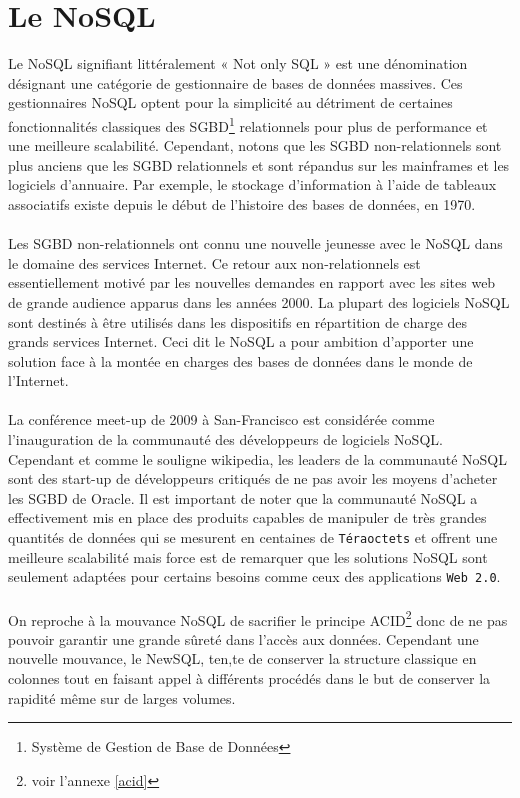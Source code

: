 \section{Le NoSQL}

Le NoSQL signifiant littéralement « \textsf{Not only SQL} » est une
dénomination désignant une catégorie de gestionnaire de bases de
données massives. Ces gestionnaires \textsf{NoSQL} optent pour la
simplicité au détriment de certaines fonctionnalités classiques des
\textsf{SGBD}\footnote{Système de Gestion de Base de Données}
relationnels pour plus de performance et une meilleure
scalabilité. Cependant, notons que les \textsf{SGBD} non-relationnels
sont plus anciens que les \textsf{SGBD} relationnels et sont répandus
sur les mainframes et les logiciels d'annuaire. Par exemple, le
stockage d'information à l'aide de tableaux associatifs existe depuis
le début de l'histoire des bases de données, en 1970.  \\ \\ Les
\textsf{SGBD} non-relationnels ont connu une nouvelle jeunesse avec le
\textsf{NoSQL} dans le domaine des services \textsf{Internet}. Ce
retour aux non-relationnels est essentiellement motivé par les
nouvelles demandes en rapport avec les sites web de grande audience
apparus dans les années 2000. La plupart des logiciels \textsf{NoSQL}
sont destinés à être utilisés dans les dispositifs en répartition de
charge des grands services \textsf{Internet}. Ceci dit le
\textsf{NoSQL} a pour ambition d'apporter une solution face à la
montée en charges des bases de données dans le monde de
l'\textsf{Internet}.  \\ \\ La conférence meet-up de 2009 à
\textsf{San-Francisco} est considérée comme l'inauguration de la
communauté des développeurs de logiciels \textsf{NoSQL}. Cependant et
comme le souligne \textsf{wikipedia}, les leaders de la communauté
NoSQL sont des \textsf{start-up} de développeurs critiqués de ne pas
avoir les moyens d'acheter les SGBD de Oracle\cite{wikiNoSQL}. Il est
important de noter que la communauté \textsf{NoSQL} a effectivement
mis en place des produits capables de manipuler de très grandes
quantités de données qui se mesurent en centaines de
\texttt{Téraoctets} et offrent une meilleure scalabilité mais force
est de remarquer que les solutions \textsf{NoSQL} sont seulement
adaptées pour certains besoins comme ceux des applications \texttt{Web
  2.0}.  \\\\ On reproche à la mouvance \textsf{NoSQL} de sacrifier le
principe \textsf{ACID}\footnote{voir l'annexe \ref{acid}} donc de ne
pas pouvoir garantir une grande sûreté dans l'accès aux
données. Cependant une nouvelle mouvance, le \textsf{NewSQL}, ten,te
de conserver la structure classique en colonnes tout en faisant appel
à différents procédés dans le but de conserver la rapidité même sur de
larges volumes\cite{newSQL}.

